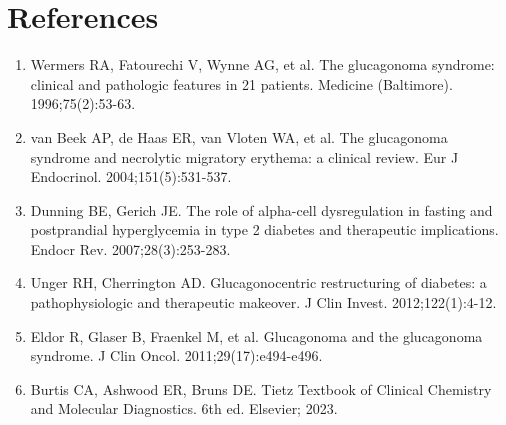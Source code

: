 \section*{References}
\begin{enumerate}
  \item Wermers RA, Fatourechi V, Wynne AG, et al. The glucagonoma syndrome: clinical and pathologic features in 21 patients. Medicine (Baltimore). 1996;75(2):53-63.
  \item van Beek AP, de Haas ER, van Vloten WA, et al. The glucagonoma syndrome and necrolytic migratory erythema: a clinical review. Eur J Endocrinol. 2004;151(5):531-537.
  \item Dunning BE, Gerich JE. The role of alpha-cell dysregulation in fasting and postprandial hyperglycemia in type 2 diabetes and therapeutic implications. Endocr Rev. 2007;28(3):253-283.
  \item Unger RH, Cherrington AD. Glucagonocentric restructuring of diabetes: a pathophysiologic and therapeutic makeover. J Clin Invest. 2012;122(1):4-12.
  \item Eldor R, Glaser B, Fraenkel M, et al. Glucagonoma and the glucagonoma syndrome. J Clin Oncol. 2011;29(17):e494-e496.
  \item Burtis CA, Ashwood ER, Bruns DE. Tietz Textbook of Clinical Chemistry and Molecular Diagnostics. 6th ed. Elsevier; 2023.
\end{enumerate}

\clearpage
